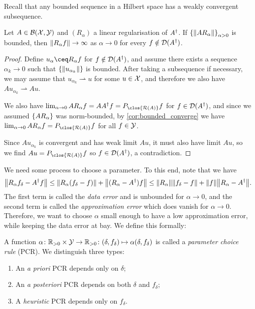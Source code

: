 \begin{recap}
	Recall that any bounded sequence in a Hilbert space has a weakly convergent subsequence. 
\end{recap}
\begin{theorem}
	Let $A \in \mathcal B(\mathcal X, \mathcal Y)$ and $(R_\alpha)$ a linear regularisation of $A^\dagger$. If $\qty{\norm{A R_\alpha}}_{\alpha > 0}$ is bounded, then $\norm{R_\alpha f} \to \infty$ as $\alpha \to 0$ for every $f \notin \operatorname{\mathcal D}(A^\dagger)$. 
\end{theorem}

\begin{proof}
	Define $u_\alpha \ceq R_\alpha f$ for $f \notin \operatorname{\mathcal D}(A^\dagger)$, and assume there exists a sequence $\alpha_k \to 0$ such that $\qty{\norm{u_{\alpha_k}}}$ is bounded. After taking a subsequence if necessary, we may assume that $u_{\alpha_k} \rightharpoonup u$ for some $u \in \mathcal X$, and therefore we also have $Au_{\alpha_k} \rightharpoonup Au$. 
	
	We also have $\lim_{\alpha \to 0} A R_\alpha f = AA\D f = P_{\clos{\Ran(A)}}f$ for $f \in \operatorname{\mathcal D}(A^\dagger)$, and since we assumed $\qty{A R_\alpha}$ was norm-bounded, by \cref{cor:bounded_converge} we have $\lim_{\alpha \to 0} AR_\alpha f = P_{\clos{\Ran(A)}} f$ for all $f \in \mathcal Y$. 
	
	Since $Au_{\alpha_k}$ is convergent and has weak limit $Au$, it must also have limit $Au$, so we find $Au = P_{\clos{\Ran(A)}} f$ so $f \in \operatorname{\mathcal D}(A^\dagger)$, a contradiction. 
\end{proof}

We need some process to choose a parameter. To this end, note that we have
\[
\norm{R_\alpha f_\delta - A^\dagger f} \leq \norm{R_\alpha (f_\delta - f)} + \norm{(R_\alpha - A^\dagger) f} \\
\leq  \norm{R_\alpha} \norm{f_\delta - f} + \norm{f} \norm{R_\alpha - A^\dagger}. 
\]
The first term is called the \emph{data error} and is unbounded for $\alpha \to 0$, and the second term is called the \emph{approximation error} which does vanish for $\alpha \to 0$. Therefore, we want to choose $\alpha$ small enough to have a low approximation error, while keeping the data error at bay. We define this formally:

\begin{definition}
	A function $\alpha \colon  \mathbb R_{> 0} \times \mathcal Y \to \mathbb R_{> 0} \colon (\delta, f_\delta) \mapsto \alpha(\delta, f_\delta)$ is called a \emph{parameter choice rule} (PCR). We distinguish three types:
	\begin{enumerate}
		\item An \emph{a priori} PCR depends only on $\delta$;
		\item An \emph{a posteriori} PCR depends on both $\delta$ and $f_\delta$;
		\item A \emph{heuristic} PCR depends only on $f_\delta$. 
	\end{enumerate}
\end{definition}